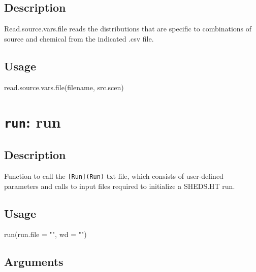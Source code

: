 \documentclass[
]{article}
\newenvironment{Shaded}{\begin{snugshade}}{\end{snugshade}}
\newcommand{\AttributeTok}[1]{\textcolor[rgb]{0.77,0.63,0.00}{#1}}
\newcommand{\FunctionTok}[1]{\textcolor[rgb]{0.00,0.00,0.00}{#1}}
\newcommand{\NormalTok}[1]{#1}
\newcommand{\StringTok}[1]{\textcolor[rgb]{0.31,0.60,0.02}{#1}}
\begin{document}
\hypertarget{description-46}{%
\subsection{Description}\label{description-46}}

Read.source.vars.file reads the distributions that are specific to
combinations of source and chemical from the indicated .csv file.

\hypertarget{usage-46}{%
\subsection{Usage}\label{usage-46}}

\begin{Shaded}
\begin{Highlighting}[]
\FunctionTok{read.source.vars.file}\NormalTok{(filename, src.scen)}
\end{Highlighting}
\end{Shaded}

\hypertarget{run-run}{%
\section{\texorpdfstring{\texttt{run}: run}{run: run}}\label{run-run}}

\hypertarget{description-47}{%
\subsection{Description}\label{description-47}}

Function to call the \texttt{{[}Run{]}(Run)} txt file, which consists of
user-defined parameters and calls to input files required to initialize
a SHEDS.HT run.

\hypertarget{usage-47}{%
\subsection{Usage}\label{usage-47}}

\begin{Shaded}
\begin{Highlighting}[]
\FunctionTok{run}\NormalTok{(}\AttributeTok{run.file =} \StringTok{""}\NormalTok{, }\AttributeTok{wd =} \StringTok{""}\NormalTok{)}
\end{Highlighting}
\end{Shaded}

\hypertarget{arguments-32}{%
\subsection{Arguments}\label{arguments-32}}
\end{document}
